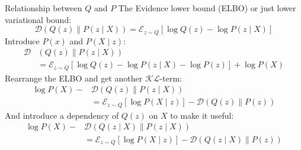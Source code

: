 \documentclass{beamer}
\begin{document}
\begin{frame}{Relationship between $Q$ and $P$}
    The Evidence lower bound (ELBO) or just lower variational bound:
    \begin{equation}
        \mathcal{D} \left( Q(z) \parallel P(z\mid X) \right) = \mathcal{E}_{z\sim Q} \left[ \log Q(z) 
        - \log P(z\mid X) \right]
    \end{equation}
    Introduce $P(x)$ and $P(X\mid z)$:
    \begin{equation}
        \begin{split}
            \mathcal{D} & \left( Q(z) \parallel P(z\mid X) \right) \\
                        &= \mathcal{E}_{z\sim Q} \left[ \log Q(z) - 
                        \log P(z\mid X) -\log P(z) \right] + \log P(X)
        \end{split}
    \end{equation}
    Rearrange the ELBO and get another $\mathcal{KL}$-term:
    \begin{equation}
        \begin{split}
            \log P(X) - & \mathcal{D} \left( Q(z) \parallel P(z\mid X) \right) \\
                        &= \mathcal{E}_{z\sim Q} \left[\log P(X\mid z) \right] - \mathcal{D}
                        \left( Q(z) \parallel P(z) \right) 
        \end{split}
    \end{equation}
    And introduce a dependency of $Q(z)$ on $X$ to make it useful:
    \begin{equation}
        \begin{split}
            \log P(X) - & \mathcal{D} \left( Q(z\mid X) \parallel P(z\mid X) \right) \\
                        &= \mathcal{E}_{z\sim Q} \left[\log P(X\mid z) \right] - \mathcal{D}
                        \left( Q(z \mid X) \parallel P(z) \right)
        \end{split}
    \end{equation}
\end{frame}
\end{document}
